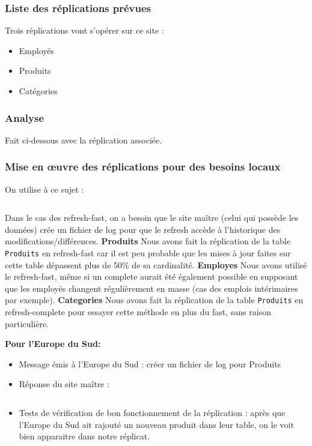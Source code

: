 \documentclass[10pt,a4paper]{article}
\theoremstyle{plain}
\begin{document}
\subsubsection{Liste des réplications prévues}
Trois réplications vont s'opérer sur ce site :
\begin{itemize}
    \item Employés
    \item Produits
    \item Catégories
\end{itemize}

\subsubsection{Analyse}
Fait ci-dessous avec la réplication associée.

\subsubsection{Mise en \oe uvre des réplications pour des besoins locaux}
On utilise à ce sujet :
\inputminted{sql}{INSA-DB12-EuropeNord-replication.sql}
Dans le cas des refresh-fast, on a besoin que le site maître (celui qui possède les données) crée un fichier de log pour que le refresh accède à l'historique des modifications/différences.
\hfill\break\hfill\break
\textbf{Produits}
Nous avons fait la réplication de la table \verb|Produits| en refresh-fast car il est peu probable que les mises à jour faites sur cette table dépassent plus de 50\% de sa cardinalité.
\hfill\break\hfill\break
\textbf{Employes}
Nous avons utilisé le refresh-fast, même si un complete aurait été également possible en supposant que les employés changent régulièrement en masse (cas des emplois intérimaires par exemple).
\hfill\break\hfill\break
\textbf{Categories}
Nous avons fait la réplication de la table \verb|Produits| en refresh-complete pour essayer cette méthode en plus du fast, sans raison particulière.
\hfill\break\hfill\break

\textbf{Pour l'Europe du Sud:}

\begin{itemize}
    \item Message émis à l'Europe du Sud : créer un fichier de log pour Produits
    \item Réponse du site maître : 
    
\inputminted{sql}{INSA-DB12-EuropeNord-rep-eu-s.sql}
    
    \item Tests de vérification de bon fonctionnement de la réplication : après que l'Europe du Sud ait rajouté un nouveau produit dans leur table, on le voit bien apparaitre dans notre réplicat.
\end{itemize}
\end{document}
